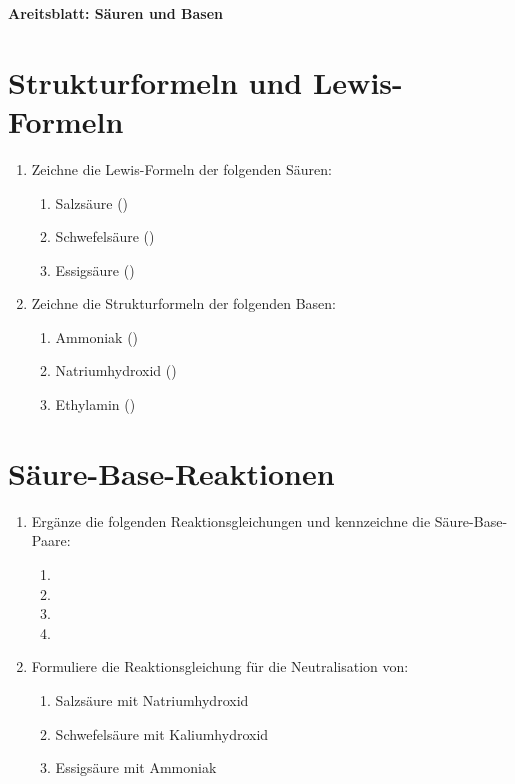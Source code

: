 \textbf{Areitsblatt: Säuren und Basen}

\section*{Strukturformeln und Lewis-Formeln}
\begin{enumerate}
    \item Zeichne die Lewis-Formeln der folgenden Säuren:
    \begin{enumerate}
        \item Salzsäure ()
        \item Schwefelsäure ()
        \item Essigsäure ()
    \end{enumerate}
    \item Zeichne die Strukturformeln der folgenden Basen:
    \begin{enumerate}
        \item Ammoniak ()
        \item Natriumhydroxid ()
        \item Ethylamin ()
    \end{enumerate}
\end{enumerate}

\section*{Säure-Base-Reaktionen}
\begin{enumerate}
    \item Ergänze die folgenden Reaktionsgleichungen und kennzeichne die Säure-Base-Paare:
    \begin{enumerate}
        \item {}
        \item {}
        \item {}
        \item {}
    \end{enumerate}
    \item Formuliere die Reaktionsgleichung für die Neutralisation von:
    \begin{enumerate}
        \item Salzsäure mit Natriumhydroxid
        \item Schwefelsäure mit Kaliumhydroxid
        \item Essigsäure mit Ammoniak
    \end{enumerate}
\end{enumerate}

